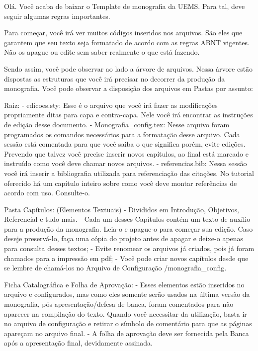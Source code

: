 Olá.
Você acaba de baixar o Template de monografia da UEMS.
Para tal, deve seguir algumas regras importantes.

Para começar, você irá ver muitos códigos inseridos nos arquivos. São eles que garantem que seu texto seja formatado de acordo com as regras ABNT vigentes. Não os apague ou edite sem saber realmente o que está fazendo.

Sendo assim, você pode observar ao lado a árvore de arquivos. Nessa árvore estão dispostas as estruturas que você irá precisar no decorrer da produção da monografia. Você pode observar a disposição dos arquivos em Pastas por assunto:

Raiz: 
- edicoes.sty: Esse é o arquivo que você irá fazer as modificações propriamente ditas para capa e contra-capa. Nele você irá encontrar as instruções de edição desse documento.
- Monografia\_config.tex: Nesse arquivo foram programados os comandos necessários para a formatação desse arquivo. Cada sessão está comentada para que você saiba o que significa porém, evite edições. Prevendo que talvez você precise inserir novos capítulos, ao final está marcado e instruído como você deve chamar novos arquivos.  
- referencias.bib: Nessa sessão você irá inserir a bibliografia utilizada para referenciação das citações. No tutorial oferecido há um capítulo inteiro sobre como você deve montar referências de acordo com uso. Consulte-o.

Pasta Capítulos: (Elementos Textuais)
- Divididos em Introdução, Objetivos, Referencial e tudo mais.
- Cada um desses Capítulos contém um texto de auxílio para a produção da monografia. Leia-o e apague-o para começar sua edição. Caso deseje preservá-lo, faça uma cópia do projeto antes de apagar e deixe-o apenas para consulta desses textos;
- Evite renomear os arquivos já criados, pois já foram chamados para a impressão em pdf;
- Você pode criar novos capítulos desde que se lembre de chamá-los no Arquivo de Configuração /monografia\_config.

Ficha Catalográfica e Folha de Aprovação: 
- Esses elementos estão inseridos no arquivo e configurados, mas como eles somente serão usados na última versão da monografia, pós apresentação/defesa de banca, foram comentados para não aparecer na compilação do texto. Quando você necessitar da utilização, basta ir no arquivo de configuração e retirar o símbolo de comentário para que as páginas apareçam no arquivo final.
- A folha de aprovação deve ser fornecida pela Banca após a apresentação final, devidamente assinada.

